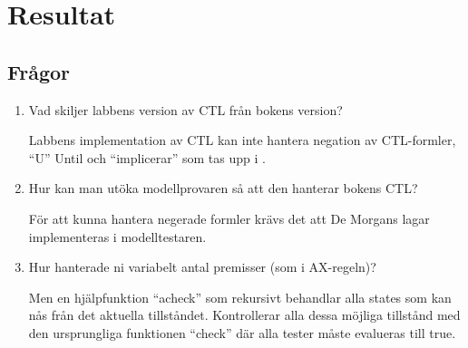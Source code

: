 \section{Resultat}
\subsection{Frågor} %
\label{sub:fragor}

\renewcommand{\labelenumi}{(\alph{enumi})}
\begin{enumerate}
\item Vad skiljer labbens version av CTL från bokens version?

Labbens implementation av CTL kan inte hantera negation av CTL-formler, “U” Until och
“implicerar” som tas upp i \cite{huth}.

\item Hur kan man utöka modellprovaren så att den hanterar bokens CTL?

För att kunna hantera negerade formler krävs det att De Morgans lagar implementeras i
modelltestaren. 

\item Hur hanterade ni variabelt antal premisser (som i AX-regeln)?

Men en hjälpfunktion “acheck” som rekursivt behandlar alla states som kan nås från det aktuella tillståndet. Kontrollerar alla dessa möjliga tillstånd med den ursprungliga funktionen “check” där alla tester måste evalueras till true.

\end{enumerate}